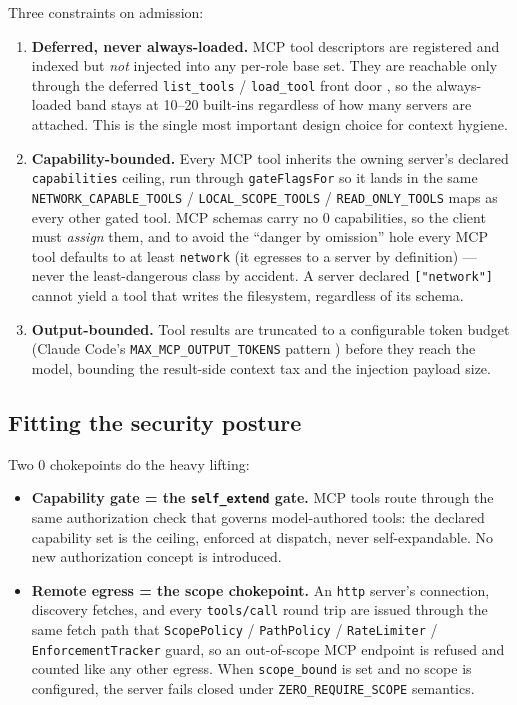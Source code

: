 \documentclass[11pt]{article}
\begin{document}
Three constraints on admission:
\begin{enumerate}[leftmargin=*]
  \item \textbf{Deferred, never always-loaded.} MCP tool descriptors are
  registered and indexed but \emph{not} injected into any per-role base set. They
  are reachable only through the deferred \texttt{list\_tools} /
  \texttt{load\_tool} front door \cite{tool-curation}, so the always-loaded band
  stays at 10--20 built-ins regardless of how many servers are attached. This is
  the single most important design choice for context hygiene.
  \item \textbf{Capability-bounded.} Every MCP tool inherits the owning server's
  declared \texttt{capabilities} ceiling, run through \texttt{gateFlagsFor} so it
  lands in the same \texttt{NETWORK\_CAPABLE\_TOOLS} / \texttt{LOCAL\_SCOPE\_TOOLS}
  / \texttt{READ\_ONLY\_TOOLS} maps as every other gated tool. MCP schemas carry
  no 0 capabilities, so the client must \emph{assign} them, and to avoid the
  ``danger by omission'' hole every MCP tool defaults to at least
  \texttt{network} (it egresses to a server by definition) --- never the
  least-dangerous class by accident. A server declared \texttt{["network"]}
  cannot yield a tool that writes the filesystem, regardless of its schema.
  \item \textbf{Output-bounded.} Tool results are truncated to a configurable
  token budget (Claude Code's \texttt{MAX\_MCP\_OUTPUT\_TOKENS} pattern
  \cite{claudecode-mcp}) before they reach the model, bounding the result-side
  context tax and the injection payload size.
\end{enumerate}

\subsection{Fitting the security posture}

Two 0 chokepoints do the heavy lifting:

\begin{itemize}[leftmargin=*]
  \item \textbf{Capability gate = the \texttt{self\_extend} gate.} MCP tools
  route through the same authorization check that governs model-authored tools:
  the declared capability set is the ceiling, enforced at dispatch, never
  self-expandable. No new authorization concept is introduced.
  \item \textbf{Remote egress = the scope chokepoint.} An \texttt{http} server's
  connection, discovery fetches, and every \texttt{tools/call} round trip are
  issued through the same fetch path that \texttt{ScopePolicy} /
  \texttt{PathPolicy} / \texttt{RateLimiter} / \texttt{EnforcementTracker} guard,
  so an out-of-scope MCP endpoint is refused and counted like any other egress.
  When \texttt{scope\_bound} is set and no scope is configured, the server fails
  closed under \texttt{ZERO\_REQUIRE\_SCOPE} semantics.
\end{itemize}
\end{document}
